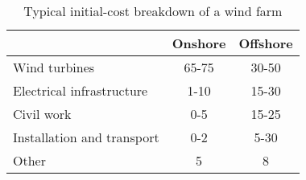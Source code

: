 \begin{table}
\label{tab:typicalcost}
\caption{Typical initial-cost breakdown of a wind farm}%

\begin{tabular}{lcc}
\hline 
 & Onshore & Offshore \\ 
\hline 
Wind turbines & 65-75 & 30-50 \\ 
Electrical infrastructure & 1-10 & 15-30 \\ 
Civil work & 0-5 & 15-25 \\ 
Installation and transport & 0-2 & 5-30 \\ 
Other & 5 & 8 \\ 
\hline 
\end{tabular}

\end{table}



